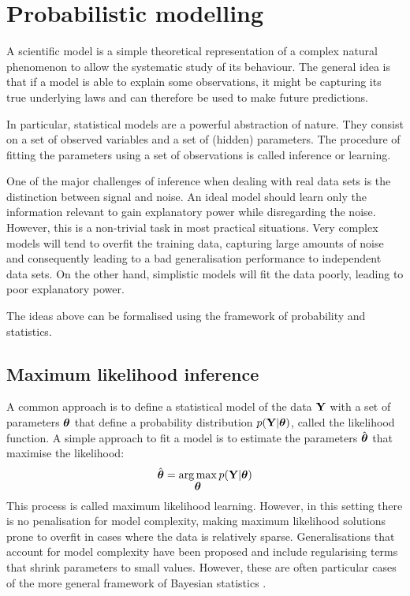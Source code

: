 \graphicspath{{Chapter2/Figs/}}



\section{Probabilistic modelling} \label{section:probabilistic_modelling}
A scientific model is a simple theoretical representation of a complex natural phenomenon to allow the systematic study of its behaviour. The general idea is that if a model is able to explain some observations, it might be capturing its true underlying laws and can therefore be used to make future predictions.

In particular, statistical models are a powerful abstraction of nature. They consist on a set of observed variables and a set of (hidden) parameters. The procedure of fitting the parameters using a set of observations is called inference or learning.

One of the major challenges of inference when dealing with real data sets is the distinction between signal and noise. An ideal model should learn only the information relevant to gain explanatory power while disregarding the noise. However, this is a non-trivial task in most practical situations. Very complex models will tend to overfit the training data, capturing large amounts of noise and consequently leading to a bad generalisation performance to independent data sets. On the other hand, simplistic models will fit the data poorly, leading to poor explanatory power.

The ideas above can be formalised using the framework of probability and statistics.

\subsection{Maximum likelihood inference} \label{section:maximum_likelihood}
A common approach is to define a statistical model of the data ${\bf Y}$ with a set of parameters $\mbox{\boldmath $\theta$}$ that define a probability distribution $p({\bf Y}|\mbox{\boldmath $\theta$})$, called the likelihood function. A simple approach to fit a model is to estimate the parameters $\hat{\mbox{\boldmath $\theta$}}$ that maximise the likelihood:
\[
	\hat{\mbox{\boldmath $\theta$}} = \operatorname*{arg\,max}_{\mbox{\boldmath $\theta$}} p({\bf Y}|\mbox{\boldmath $\theta$})
\]
This process is called maximum likelihood learning\cite{Stigler2008,Bishop,Murphy}. However, in this setting there is no penalisation for model complexity, making maximum likelihood solutions prone to overfit in cases where the data is relatively sparse. Generalisations that account for model complexity have been proposed and include regularising terms that shrink parameters to small values. However, these are often particular cases of the more general framework of Bayesian statistics \cite{Hastie,Bishop,Murphy}.

